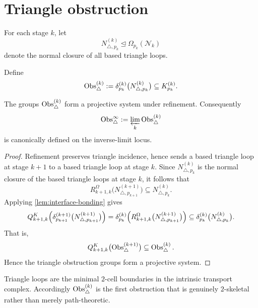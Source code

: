 \section{Triangle obstruction}
\label{sec:interface-triangle}
For each stage \(k\), let
\[
	N_{\triangle,p_k}^{(k)}\trianglelefteq \Omega_{p_k}(\mathcal N_k)
\]
denote the normal closure of all based triangle loops.
\begin{definition}
	Define
	\[
		\operatorname{Obs}_\triangle^{(k)}
		:=
		\delta_{p_k}^{(k)}\bigl(N_{\triangle,p_k}^{(k)}\bigr)
		\subseteq
		K_{p_k}^{(k)}.
	\]
\end{definition}
\begin{proposition}
	The groups \(\operatorname{Obs}_\triangle^{(k)}\) form a projective system under
	refinement. Consequently
	\[
		\operatorname{Obs}_\triangle^\infty
		:=
		\varprojlim_k \operatorname{Obs}_\triangle^{(k)}
	\]
	is canonically defined on the inverse-limit locus.
\end{proposition}
\begin{proof}
	Refinement preserves triangle incidence, hence sends a based triangle
	loop at stage \(k+1\) to a based triangle loop at stage \(k\). Since
	\(N_{\triangle,p_k}^{(k)}\) is the normal closure of the based triangle loops at stage
	\(k\), it follows that
	\[
		R_{k+1,k}^{\Omega}\bigl(N_{\triangle,p_{k+1}}^{(k+1)}\bigr)
		\subseteq
		N_{\triangle,p_k}^{(k)}.
	\]
	Applying \cref{lem:interface-bonding} gives
	\[
		Q_{k+1,k}^{K}\Bigl(\delta_{p_{k+1}}^{(k+1)}\bigl(N_{\triangle,p_{k+1}}^{(k+1)}\bigr)\Bigr)
		=
		\delta_{p_k}^{(k)}\Bigl(R_{k+1,k}^{\Omega}\bigl(N_{\triangle,p_{k+1}}^{(k+1)}\bigr)\Bigr)
		\subseteq
		\delta_{p_k}^{(k)}\bigl(N_{\triangle,p_k}^{(k)}\bigr).
	\]
	That is,
	\[
		Q_{k+1,k}^{K}\bigl(\operatorname{Obs}_\triangle^{(k+1)}\bigr)
		\subseteq
		\operatorname{Obs}_\triangle^{(k)}.
	\]
	Hence the triangle obstruction groups form a projective system.
\end{proof}
\begin{remark}
	Triangle loops are the minimal \(2\)-cell boundaries in the intrinsic
	transport complex.
	Accordingly \(\operatorname{Obs}_\triangle^{(k)}\) is the first obstruction that is
	genuinely \(2\)-skeletal rather than merely path-theoretic.
\end{remark}
